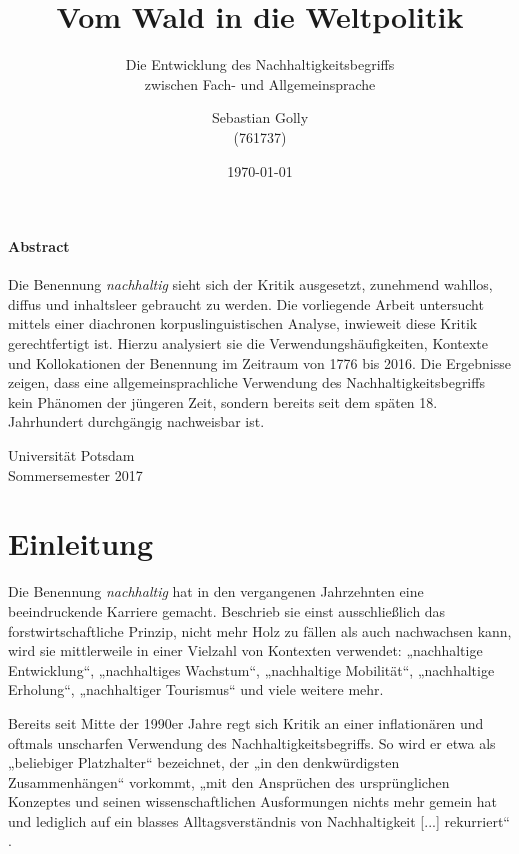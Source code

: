 \documentclass[
    german,
    a4paper,%
    12pt,%
    oneside,%
    toc=bibliography,
    final,
]{scrartcl}
\title{Vom Wald in die Weltpolitik}
\subtitle{Die Entwicklung des Nachhaltigkeitsbegriffs \\zwischen Fach- und Allgemeinsprache}
\author{Sebastian Golly\\ {\normalsize (761737)}}
\date{\today}
\begin{document}
\maketitle

\vfill

\paragraph{Abstract}

Die Benennung \textit{nachhaltig} sieht sich der Kritik ausgesetzt, zunehmend wahllos, diffus und inhaltsleer gebraucht zu werden. Die vorliegende Arbeit untersucht mittels einer diachronen korpuslinguistischen Analyse, inwieweit diese Kritik gerechtfertigt ist. Hierzu analysiert sie die Verwendungshäufigkeiten, Kontexte und Kollokationen der Benennung im Zeitraum von 1776 bis 2016. Die Ergebnisse zeigen, dass eine allgemeinsprachliche Verwendung des Nachhaltigkeitsbegriffs kein Phänomen der jüngeren Zeit, sondern bereits seit dem späten 18. Jahrhundert durchgängig nachweisbar ist.
\\[3em]

\vfill

\begin{center}
Universität Potsdam\\[1.5em]
Sommersemester 2017
\end{center}

\thispagestyle{empty}
\newpage


\section{Einleitung}
\label{sec:einleitung}

Die Benennung \textit{nachhaltig} hat in den vergangenen Jahrzehnten eine beeindruckende Karriere gemacht. Beschrieb sie einst ausschließlich das forstwirtschaftliche Prinzip, nicht mehr Holz zu fällen als auch nachwachsen kann, wird sie mittlerweile in einer Vielzahl von Kontexten verwendet: „nachhaltige Entwicklung“, „nachhaltiges Wachstum“, „nachhaltige Mobilität“, „nachhaltige Erholung“, „nachhaltiger Tourismus“ und viele weitere mehr.

Bereits seit Mitte der 1990er Jahre regt sich Kritik an einer inflationären und oftmals unscharfen Verwendung des Nachhaltigkeitsbegriffs. So wird er etwa als „beliebiger Platzhalter“ \citep[141]{Vogel2011} bezeichnet, der „in den denkwürdigsten Zusammenhängen“ \citep[46]{Ninck1997} vorkommt, „mit den Ansprüchen des ursprünglichen Konzeptes und seinen wissenschaftlichen Ausformungen nichts mehr gemein hat und lediglich auf ein blasses Alltagsverständnis von Nachhaltigkeit [...] rekurriert“ \citep[5]{OhlmeierBrunold2015}.
\end{document}
